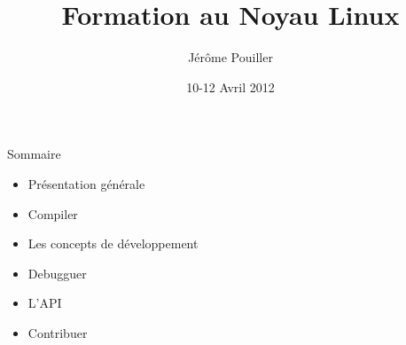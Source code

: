 \documentclass[10pt,ucs,usepdftitle=false]{beamer}
\title{Formation au Noyau Linux}
\author[J. Pouiller]{Jérôme Pouiller \email{j.pouiller@sysmic.org}}
\institute[Sysmic]{\hspace*{1cm}\pgfimage[height=1.5cm]{pics/logo}}
\date[Avr. 2012]{10-12 Avril 2012}
\begin{document}
 
  \begin{frame}[plain]
    \maketitle
  \end{frame}

  \begin{frame}{Sommaire}
    \begin{itemize} 
      \item Présentation générale
      \item Compiler
      \item Les concepts de développement
      \item Debugguer
      \item L'API
      \item Contribuer
    \end{itemize} 
  \end{frame}
  






  
  
  
  
  
  
\end{document}
